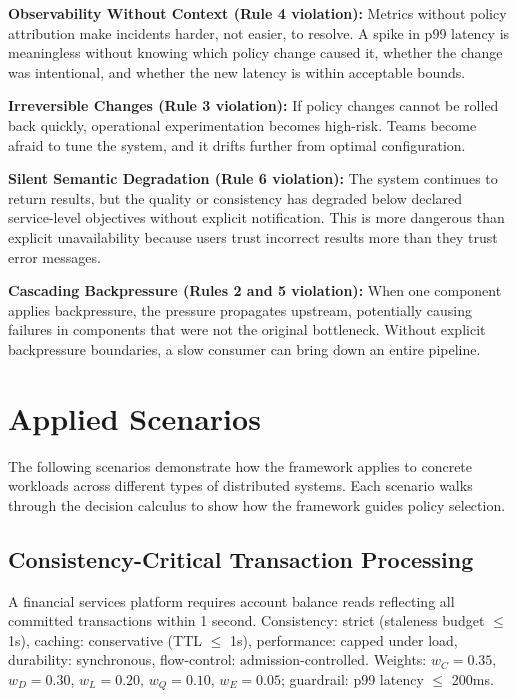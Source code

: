 \documentclass[conference]{IEEEtran}
\begin{document}
\medskip

\noindent\textbf{Observability Without Context (Rule 4 violation):} Metrics without policy attribution make incidents harder, not easier, to resolve. A spike in p99 latency is meaningless without knowing which policy change caused it, whether the change was intentional, and whether the new latency is within acceptable bounds.

\medskip

\noindent\textbf{Irreversible Changes (Rule 3 violation):} If policy changes cannot be rolled back quickly, operational experimentation becomes high-risk. Teams become afraid to tune the system, and it drifts further from optimal configuration.

\medskip

\noindent\textbf{Silent Semantic Degradation (Rule 6 violation):} The system continues to return results, but the quality or consistency has degraded below declared service-level objectives without explicit notification. This is more dangerous than explicit unavailability because users trust incorrect results more than they trust error messages.

\medskip

\noindent\textbf{Cascading Backpressure (Rules 2 and 5 violation):} When one component applies backpressure, the pressure propagates upstream, potentially causing failures in components that were not the original bottleneck. Without explicit backpressure boundaries, a slow consumer can bring down an entire pipeline.

\section{Applied Scenarios}
\label{sec:scenarios}
The following scenarios demonstrate how the framework applies to concrete workloads across different types of distributed systems. Each scenario walks through the decision calculus to show how the framework guides policy selection.

\subsection{Consistency-Critical Transaction Processing}

A financial services platform requires account balance reads reflecting all committed transactions within 1 second. Consistency: strict (staleness budget $\leq$ 1s), caching: conservative (TTL $\leq$ 1s), performance: capped under load, durability: synchronous, flow-control: admission-controlled. Weights: $w_C=0.35$, $w_D=0.30$, $w_L=0.20$, $w_Q=0.10$, $w_E=0.05$; guardrail: p99 latency $\leq$ 200ms.
\end{document}
